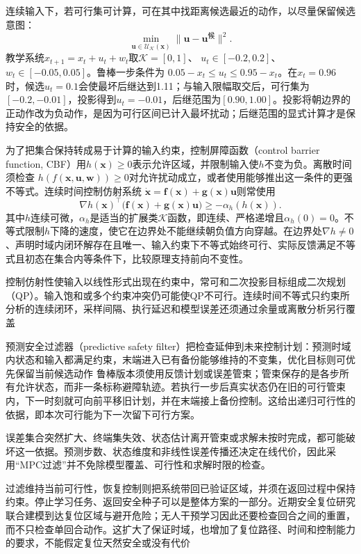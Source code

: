 连续输入下，若可行集可计算，可在其中找距离候选最近的动作，以尽量保留候选意图：
\[
  \min_{\bm{u}\in\mathcal U_{\mathcal K}(\bm{x})}
          \|\bm{u}-\bm{u}^{\text{候}}\|^2.
\]
教学系统$x_{t+1}=x_t+u_t+w_t$取$\mathcal K=[0,1]$、
$u_t\in[-0.2,0.2]$、$w_t\in[-0.05,0.05]$。鲁棒一步条件为
$0.05-x_t\leq u_t\leq0.95-x_t$。在$x_t=0.96$时，候选$u_t=0.1$会使最坏后继达到1.11；与输入限幅取交后，可行集为$[-0.2,-0.01]$，投影得到$u_t=-0.01$，后继范围为$[0.90,1.00]$。投影将朝边界的正动作改为负动作，是因为可行区间已计入最坏扰动；后继范围的显式计算才是保持安全的依据。

为了把集合保持转成易于计算的输入约束，控制屏障函数（control barrier function, CBF）用$h(\bm{x})\geq0$表示允许区域，并限制输入使$h$不变为负。离散时间须检查
$h(f(\bm{x},\bm{u},\bm{w}))\geq0$对允许扰动成立，或者使用能够推出这一条件的更强不等式。连续时间控制仿射系统
$\dot{\bm{x}}=\bm{f}(\bm{x})+\bm{g}(\bm{x})\bm{u}$则常使用
\[
  \nabla h(\bm{x})^\top
       \bigl(\bm{f}(\bm{x})+\bm{g}(\bm{x})\bm{u}\bigr)
        \geq-\alpha_h(h(\bm{x})).
\]
其中$h$连续可微，$\alpha_h$是适当的扩展类$\mathcal K$函数，即连续、严格递增且$\alpha_h(0)=0$。不等式限制$h$下降的速度，使它在边界处不能继续朝负值方向穿越。在边界处$\nabla h\neq0$、声明时域内闭环解存在且唯一、输入约束下不等式始终可行、实际反馈满足不等式且初态在集合内等条件下，比较原理支持前向不变性。

控制仿射性使输入以线性形式出现在约束中，常可和二次投影目标组成二次规划（QP）。输入饱和或多个约束冲突仍可能使QP不可行。连续时间不等式只约束所分析的连续闭环，采样间隔、执行延迟和模型误差还须通过余量或离散分析另行覆盖

预测安全过滤器（predictive safety filter）把检查延伸到未来控制计划：预测时域内状态和输入都满足约束，末端进入已有备份能够维持的不变集，优化目标则可优先保留当前候选动作
鲁棒版本须使用反馈计划或误差管束；管束保存的是各步所有允许状态，而非一条标称避障轨迹。若执行一步后真实状态仍在旧的可行管束内，下一时刻就可向前平移旧计划，并在末端接上备份控制。这给出递归可行性的依据，即本次可行能为下一次留下可行方案。

误差集合突然扩大、终端集失效、状态估计离开管束或求解未按时完成，都可能破坏这一依据。预测步数、状态维度和非线性误差传播还决定在线代价，因此采用“MPC过滤”并不免除模型覆盖、可行性和求解时限的检查。

过滤维持当前可行性，恢复控制则把系统带回已验证区域，并须在返回过程中保持约束。停止学习任务、返回安全种子可以是整体方案的一部分。近期安全复位研究联合建模到达复位区域与避开危险；无人干预学习因此还要检查回合之间的重置，而不只检查单回合动作。这扩大了保证时域，也增加了复位路径、时间和控制能力的要求，不能假定复位天然安全或没有代价

